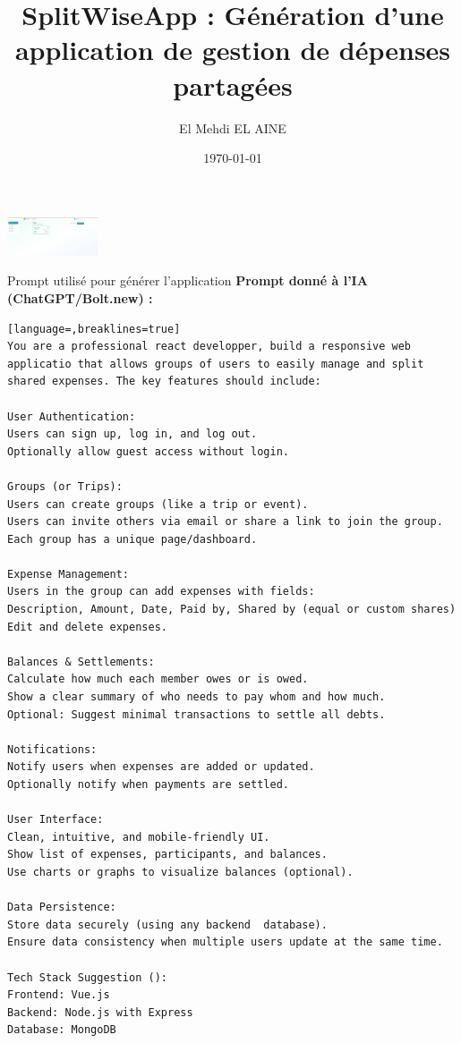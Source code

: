 \documentclass{beamer}
\author{El Mehdi EL AINE}
\title{SplitWiseApp : Génération d'une application de gestion de dépenses partagées}
\date{\today}
\begin{document}
\begin{frame}
  \titlepage
  \centering
  \includegraphics[width=0.2\textwidth]{app-screens/Groups_Screen.png}
\end{frame}

\begin{frame}{Prompt utilisé pour générer l'application}
\textbf{Prompt donné à l'IA (ChatGPT/Bolt.new) :}
\begin{lstlisting}[language=,breaklines=true]
You are a professional react developper, build a responsive web applicatio that allows groups of users to easily manage and split shared expenses. The key features should include:

User Authentication:
Users can sign up, log in, and log out.
Optionally allow guest access without login.

Groups (or Trips):
Users can create groups (like a trip or event).
Users can invite others via email or share a link to join the group.
Each group has a unique page/dashboard.

Expense Management:
Users in the group can add expenses with fields:
Description, Amount, Date, Paid by, Shared by (equal or custom shares)
Edit and delete expenses.

Balances & Settlements:
Calculate how much each member owes or is owed.
Show a clear summary of who needs to pay whom and how much.
Optional: Suggest minimal transactions to settle all debts.

Notifications:
Notify users when expenses are added or updated.
Optionally notify when payments are settled.

User Interface:
Clean, intuitive, and mobile-friendly UI.
Show list of expenses, participants, and balances.
Use charts or graphs to visualize balances (optional).

Data Persistence:
Store data securely (using any backend  database).
Ensure data consistency when multiple users update at the same time.

Tech Stack Suggestion ():
Frontend: Vue.js
Backend: Node.js with Express
Database: MongoDB
\end{lstlisting}
\end{frame}
\end{document}
